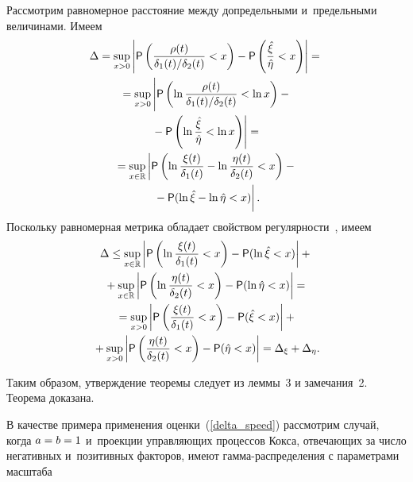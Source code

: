 \begin{multicols}{2}
Рассмотрим равномерное расстояние между допредельными и~предельными величинами. 
Имеем
\begin{multline*}
\Delta=\sup\limits_{x>0}\left|{\sf P}\left(\fr{\rho(t)}{\delta_1(t)/\delta_2(t)}<x\right)-
{\sf P}\left(\fr{\hat \xi}{\hat\eta}<x\right)\right|={}
\\
{}=\sup\limits_{x>0}\left|
\vphantom{\left(\ln\fr{\hat \xi}{\hat\eta}<\ln x\right)}
{\sf P}\left(\ln \fr{\rho(t)}{\delta_1(t)/\delta_2(t)}<\ln 
x\right)-{}\right.\\
\left.{}-{\sf P}\left(\ln\fr{\hat \xi}{\hat\eta}<\ln x\right)\right|={}
\\
{}=\sup\limits_{x\in\mathbb{R}}\left|{\sf P}\left(\ln \fr{\xi(t)}{\delta_1 (t)}-\ln 
\fr{\eta(t)}{\delta_2 (t)}< x\right)-{}\right.\\
\left.{}-{\sf P}(\ln{\hat \xi}-\ln{\hat\eta}< 
x)
\vphantom{\left(\ln \fr{\xi(t)}{\delta_1 (t)}-\ln 
\fr{\eta(t)}{\delta_2 (t)}< x\right)}
\right|.
\end{multline*}
Поскольку равномерная метрика обладает свойством регулярности~\cite{Senatov1998}, имеем
\begin{multline*}
\Delta\le\sup\limits_{x\in\mathbb{R}}\left|{\sf P}\left(\ln \displaystyle\frac{\displaystyle \xi(t)\mathstrut}{\displaystyle \delta_1 (t)\mathstrut}< 
x\right)-{\sf P}(\ln{\hat \xi}< x)\right|+{}\\
{}+
\sup\limits_{x\in\mathbb{R}}\left|{\sf P}\left(\ln \displaystyle\frac{\displaystyle \eta(t)\mathstrut}{\displaystyle \delta_2 (t)\mathstrut}< x\right)-
{\sf P}(\ln{\hat\eta}< x)\right|={}
\\
{}=\sup\limits_{x>0}\left|{\sf P}\left( \displaystyle\frac{\displaystyle \xi(t)\mathstrut}{\displaystyle \delta_1 (t)\mathstrut}< x\right)-{\sf P}({\hat \xi}< 
x)\right|+{}\\
{}+
\sup\limits_{x>0}\left|{\sf P}\left( \displaystyle\frac{\displaystyle \eta(t)\mathstrut}{\displaystyle \delta_2 (t)\mathstrut}< x\right)-{\sf P}({\hat\eta}< 
x)\right|=\Delta_\xi+\Delta_\eta.
\end{multline*}

Таким образом, утверждение теоремы следует из леммы~3 и
замечания~2. Теорема доказана.

\smallskip

В качестве примера применения оценки~(\ref{delta_speed}) рассмотрим случай, 
когда  $a\hm=b\hm=1$ и~проекции управ\-ля\-ющих процессов Кокса, отвечающих за число 
негативных и~позитивных факторов, имеют гам\-ма-рас\-пре\-де\-ле\-ния с па\-ра\-мет\-ра\-ми 
масштаба 

\pagebreak


\end{multicols}
